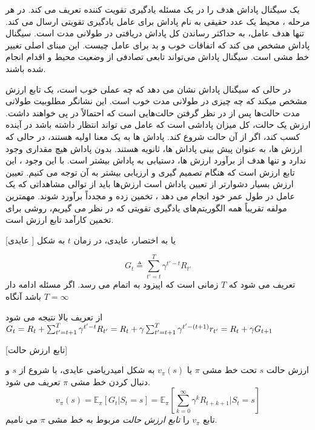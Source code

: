 
یک سیگنال پاداش هدف را در یک مسئله یادگیری تقویت کننده تعریف می کند. در هر مرحله ، محیط یک عدد حقیقی به نام پاداش برای عامل یادگیری تقویتی ارسال می کند. تنها هدف عامل، به حداکثر رساندن کل پاداش دریافتی در طولانی مدت است. سیگنال پاداش مشخص می کند که اتفاقات خوب و بد برای عامل چیست. این مبنای اصلی تغییر خط مشی است.
سیگنال پاداش می‌تواند تابعی تصادفی از وضعیت محیط و اقدام انجام شده باشند.


در حالی که سیگنال پاداش نشان می دهد که چه عملی خوب است، یک تابع ارزش مشخص می\nf کند که چه چیزی در طولانی مدت خوب است. این نشانگر مطلوبیت طولانی مدت حالت‌ها پس از در نظر گرفتن حالت‌هایی است که احتمالاً در پی خواهند داشت.
ارزش یک حالت، کل میزان پاداشی است که عامل می تواند انتظار داشته باشد در آینده کسب کند، اگر از آن حالت شروع کند.
پاداش ها به یک معنا اولیه هستند، در حالی که ارزش ها، به عنوان پیش بینی پاداش ها، ثانویه هستند. بدون پاداش هیچ مقداری وجود ندارد و تنها هدف از برآورد ارزش ها، دستیابی به پاداش بیشتر است. با این وجود ، این تابع ارزش است که هنگام تصمیم گیری و ارزیابی بیشتر به آن توجه می کنیم.
تعیین ارزش‌ بسیار دشوارتر از تعیین پاداش است
ارزش‌ها باید از توالی مشاهداتی که یک عامل در طول عمر خود انجام می دهد ، تخمین زده و مجدداً برآورد شوند.
مهمترین مولفه تقریباً همه الگوریتم‌های یادگیری تقویتی که در نظر می گیریم، روشی برای تخمین کارآمد تابع ارزش است.

[عایدی ]
 یا به اختصار، عایدی، در زمان $t$ به شکل

$$G_t \triangleq \sum_{t'=t}^{T} \gamma^{t'-t} R_{t'}$$
تعریف می شود که $T$ زمانی است که اپیزود به اتمام می رسد. اگر مسئله ادامه دار باشد آنگاه 
$T=\infty$

از تعریف بالا نتیجه می شود 
$G_t = R_t + \sum_{t'=t+1}^{T} \gamma^{t'-t} R_{t'} \\
= R_t + \gamma \sum_{t'=t+1}^{T} \gamma^{t' - (t+1)} r_{t'} \\
= R_t + \gamma G_{t+1} \\
$

[تابع ارزش حالت]

 ارزش حالت $s$ تحت خط مشی $\pi$ یا $v_\pi(s)$ به شکل امیدریاضی عایدی، با شروع از $s$ و دنبال کردن خط مشی $\pi$ تعریف می شود.
$$v_\pi(s) = \mathbb{E}_\pi\left[G_t| S_t=s\right] = \mathbb{E}_\pi\left[\sum_{k=0}^{\infty} \gamma^k R_{t+k+1}|S_t =s \right]$$
تابع $v_\pi$ را 
\textit{تابع ارزش حالت}
 مربوط به خط مشی 
$\pi$
می نامیم.

